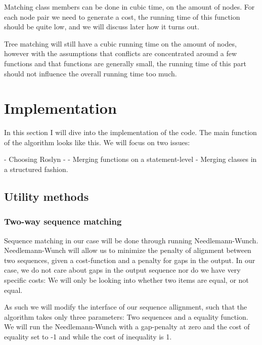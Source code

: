 \documentclass[11pt]{article}
\begin{document}
Matching class members can be done in cubic time, on the amount of nodes. For each node pair we need to generate a cost, the running time of this function should be quite low, and we will discuss later how it turns out. 

Tree matching will still have a cubic running time on the amount of nodes, however with the assumptions that conflicts are concentrated around a few functions and that functions are generally small, the running time of this part should not influence the overall running time too much.

\clearpage

\section{Implementation}
In this section I will dive into the implementation of the code. The main function of the algorithm looks like this. We will focus on two issues:

- Choosing Roslyn
- 
- Merging functions on a statement-level
- Merging classes in a structured fashion.



\subsection{Utility methods}

\subsubsection{Two-way sequence matching}
Sequence matching in our case will be done through running Needlemann-Wunch. Needlemann-Wunch will allow us to minimize the penalty of alignment between two sequences, given a cost-function and a penalty for gaps in the output. In our case, we do not care about gaps in the output sequence nor do we have very specific costs: We will only be looking into whether two items are equal, or not equal.

As such we will modify the interface of our sequence allignment, such that the algorithm takes only three parameters: Two sequences and a equality function. We will run the Needlemann-Wunch with a gap-penalty at zero and the cost of equality set to -1 and while the cost of inequality is 1.

\end{document}
